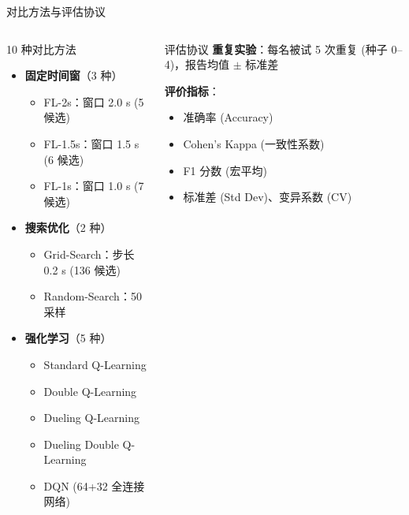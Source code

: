 {\begin{frame}{对比方法与评估协议}
    \begin{columns}[T]
        \begin{block}{10 种对比方法}
            \footnotesize
            \begin{itemize}
                \item \textbf{固定时间窗}（3 种）
                \begin{itemize}
                    \scriptsize
                    \item FL-2s：窗口 2.0 s (5 候选)
                    \item FL-1.5s：窗口 1.5 s (6 候选)
                    \item FL-1s：窗口 1.0 s (7 候选)
                \end{itemize}
                \item \textbf{搜索优化}（2 种）
                \begin{itemize}
                    \scriptsize
                    \item Grid-Search：步长 0.2 s (136 候选)
                    \item Random-Search：50 采样
                \end{itemize}
                \item \textbf{强化学习}（5 种）
                \begin{itemize}
                    \scriptsize
                    \item Standard Q-Learning
                    \item Double Q-Learning
                    \item Dueling Q-Learning
                    \item Dueling Double Q-Learning
                    \item DQN (64+32 全连接网络)
                \end{itemize}
            \end{itemize}
        \end{block}

        \begin{block}{评估协议}
            \footnotesize
            \cite{tangermann2012review,cohen1960coefficient}
            \textbf{重复实验}：每名被试 5 次重复 (种子 0--4)，报告均值 $\pm$ 标准差
            
            \textbf{评价指标}：
            \begin{itemize}
                \item 准确率 (Accuracy)
                \item Cohen's Kappa (一致性系数)
                \item F1 分数 (宏平均)
                \item 标准差 (Std Dev)、变异系数 (CV)
            \end{itemize}


\end{block}
\end{columns}
\end{frame}}
